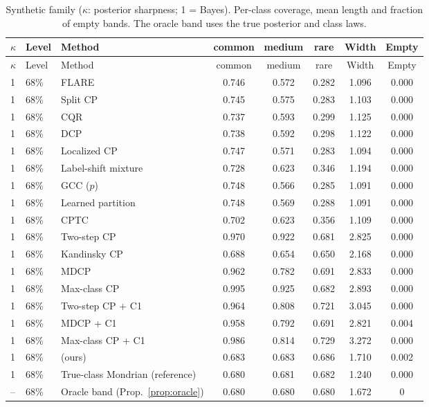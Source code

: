 \begingroup
\scriptsize
\begin{longtable}{llp{4cm}ccccc}
\caption{Synthetic family ($\kappa$: posterior sharpness; 1 = Bayes). Per-class coverage, mean length and fraction of empty bands. The oracle band uses the true posterior and class laws.}
\label{tab:synthetic}\\
\toprule
$\kappa$ & Level & Method & common & medium & rare & Width & Empty \\
\midrule
\endfirsthead
\toprule
$\kappa$ & Level & Method & common & medium & rare & Width & Empty \\
\midrule
\endhead
1 & 68\% & FLARE & 0.746 & 0.572 & 0.282 & 1.096 & 0.000 \\
1 & 68\% & Split CP & 0.745 & 0.575 & 0.283 & 1.103 & 0.000 \\
1 & 68\% & CQR & 0.737 & 0.593 & 0.299 & 1.125 & 0.000 \\
1 & 68\% & DCP & 0.738 & 0.592 & 0.298 & 1.122 & 0.000 \\
1 & 68\% & Localized CP & 0.747 & 0.571 & 0.283 & 1.094 & 0.000 \\
1 & 68\% & Label-shift mixture & 0.728 & 0.623 & 0.346 & 1.194 & 0.000 \\
1 & 68\% & GCC ($p$) & 0.748 & 0.566 & 0.285 & 1.091 & 0.000 \\
1 & 68\% & Learned partition & 0.748 & 0.569 & 0.288 & 1.091 & 0.000 \\
1 & 68\% & CPTC & 0.702 & 0.623 & 0.356 & 1.109 & 0.000 \\
1 & 68\% & Two-step CP & 0.970 & 0.922 & 0.681 & 2.825 & 0.000 \\
1 & 68\% & Kandinsky CP & 0.688 & 0.654 & 0.650 & 2.168 & 0.000 \\
1 & 68\% & MDCP & 0.962 & 0.782 & 0.691 & 2.833 & 0.000 \\
1 & 68\% & Max-class CP & 0.995 & 0.925 & 0.682 & 2.893 & 0.000 \\
1 & 68\% & Two-step CP + C1 & 0.964 & 0.808 & 0.721 & 3.045 & 0.000 \\
1 & 68\% & MDCP + C1 & 0.958 & 0.792 & 0.691 & 2.821 & 0.004 \\
1 & 68\% & Max-class CP + C1 & 0.986 & 0.814 & 0.729 & 3.272 & 0.000 \\
1 & 68\% & \gamut{} (ours) & 0.683 & 0.683 & 0.686 & 1.710 & 0.002 \\
1 & 68\% & True-class Mondrian (reference) & 0.680 & 0.681 & 0.682 & 1.240 & 0.000 \\
-- & 68\% & Oracle band (Prop.~\ref{prop:oracle}) & 0.680 & 0.680 & 0.680 & 1.672 & 0 \\

\end{longtable}
